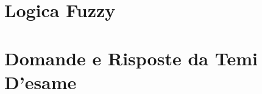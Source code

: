 \providecommand{\main}{.}








{\hypersetup{hidelinks}
	\tableofcontents  %
}

%

\chapter{Logica Fuzzy}



\appendix
\chapter{Domande e Risposte da Temi D'esame}





